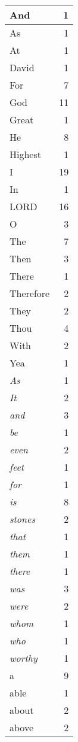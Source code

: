 \begin{center}
\begin{longtable}{l|r}
\hline \hline
\endlastfoot
And & 1 \\ \hline
As & 1 \\ \hline
At & 1 \\ \hline
David & 1 \\ \hline
For & 7 \\ \hline
God & 11 \\ \hline
Great & 1 \\ \hline
He & 8 \\ \hline
Highest & 1 \\ \hline
I & 19 \\ \hline
In & 1 \\ \hline
LORD & 16 \\ \hline
O & 3 \\ \hline
The & 7 \\ \hline
Then & 3 \\ \hline
There & 1 \\ \hline
Therefore & 2 \\ \hline
They & 2 \\ \hline
Thou & 4 \\ \hline
With & 2 \\ \hline
Yea & 1 \\ \hline
\emph{As} & 1 \\ \hline
\emph{It} & 2 \\ \hline
\emph{and} & 3 \\ \hline
\emph{be} & 1 \\ \hline
\emph{even} & 2 \\ \hline
\emph{feet} & 1 \\ \hline
\emph{for} & 1 \\ \hline
\emph{is} & 8 \\ \hline
\emph{stones} & 2 \\ \hline
\emph{that} & 1 \\ \hline
\emph{them} & 1 \\ \hline
\emph{there} & 1 \\ \hline
\emph{was} & 3 \\ \hline
\emph{were} & 2 \\ \hline
\emph{whom} & 1 \\ \hline
\emph{who} & 1 \\ \hline
\emph{worthy} & 1 \\ \hline
a & 9 \\ \hline
able & 1 \\ \hline
about & 2 \\ \hline
above & 2 \\ \hline

\end{longtable}
\end{center}
